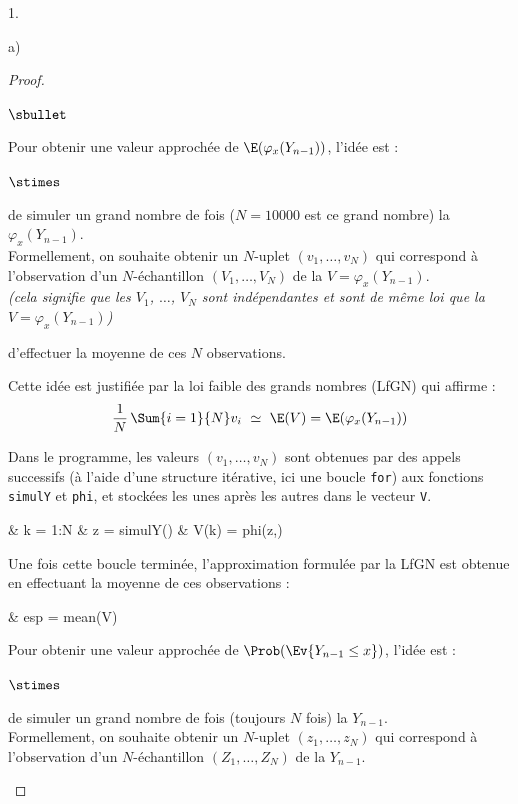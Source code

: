 \documentclass[11pt]{article}%
\begin{document}
\begin{noliste}{1.}
\begin{noliste}{a)}
\begin{proof}
\begin{noliste}{$\sbullet$}
	
	\newpage
	
	
	\item Pour obtenir une valeur approchée de 
	$\E(\varphi_x(Y_{n-1}))$, l'idée est :
	\begin{noliste}{$\stimes$}
	  \item de simuler un grand nombre de fois ($N=10000$ est 
	  ce grand nombre) la \var $\varphi_x(Y_{n-1})$.\\
	  Formellement, on souhaite obtenir un $N$-uplet $(v_1, 
	  \ldots, v_N)$ qui correspond à l'observation d'un 
	  $N$-échantillon $(V_1, \ldots, V_N)$ de la \var $V= 
	  \varphi_x(Y_{n-1})$.\\
	  {\it (cela signifie que les \var $V_1$, $\ldots$, $V_N$
	  sont indépendantes et sont de même loi que
	  la \var $V= \varphi_x
	  (Y_{n-1})$)}
	  
	  \item d'effectuer la moyenne de ces $N$ observations.
	\end{noliste}
	Cette idée est justifiée par la loi faible des grands 
	nombres (LfGN) qui affirme : 
	\[
	  \dfrac{1}{N} \, \Sum{i=1}{N} v_i \ \simeq \ \E(V)  = 
	  \E(\varphi_x(Y_{n-1}))
	\]
	
	\item Dans le programme, les valeurs $(v_1, \ldots, v_N)$ 
	sont obtenues par des appels successifs (à l'aide d'une 
	structure itérative, ici une boucle {\tt for}) aux
	fonctions {\tt simulY} et {\tt phi}, et stockées les 
	unes après les autres dans le vecteur {\tt V}.
	\begin{scilabC}{4}
	  & \quad {} k = 1:N \nl %
	  & \quad \quad z = simulY() \nl %
	  & \quad \quad V(k) = phi(z,)
	\end{scilabC}
	Une fois cette boucle terminée, l'approximation formulée par 
	la LfGN est obtenue en effectuant la moyenne de ces 
	observations :
	\begin{scilabC}{13}
	  & \quad esp = mean(V)
	\end{scilabC}
	
	\item Pour obtenir une valeur approchée de $\Prob(\Ev{Y_{n-1}
	\leq x})$, l'idée est :
	\begin{noliste}{$\stimes$}
	  \item de simuler un grand nombre de fois (toujours $N$ fois)
	  la \var $Y_{n-1}$.\\
	  Formellement, on souhaite obtenir un $N$-uplet $(z_1, 
	  \ldots, z_N)$ qui correspond à l'observation d'un 
	  $N$-échantillon $(Z_1,\ldots, Z_N)$ de la \var $Y_{n-1}$.
	  

\end{noliste}
\end{noliste}
\end{proof}
\end{noliste}
\end{noliste}
\end{document}
